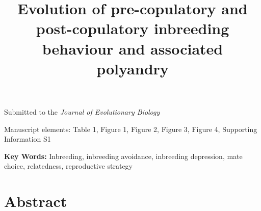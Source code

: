 \documentclass[12pt]{article}
\title{Evolution of pre-copulatory and post-copulatory inbreeding behaviour and associated polyandry}
\date{}
\begin{document}
\maketitle

\begin{center}
\vspace{5 mm}


\vspace{5 mm}


\vspace{15 mm}

\noindent Submitted to the \emph{Journal of Evolutionary Biology}  

\vspace{15 mm} 

\noindent Manuscript elements: Table 1, Figure 1, Figure 2, Figure 3, Figure 4, Supporting Information S1 

\vspace{15 mm}

\noindent \textbf{Key Words:} Inbreeding, inbreeding avoidance, inbreeding depression, mate choice, relatedness, reproductive strategy
\newline

\end{center}

\linenumbers
\modulolinenumbers[2]
\doublespacing

\clearpage

\section*{Abstract} 
\end{document}
